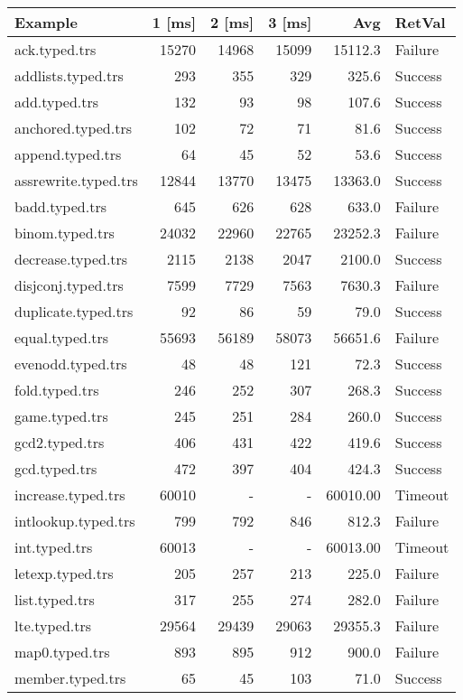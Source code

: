 \documentclass[11pt]{article}
\begin{document}
\begin{center}
\begin{tabular}{lrrrrl}
Example & 1 [ms] & 2 [ms] & 3 [ms] & Avg & RetVal\\
\hline
ack.typed.trs & 15270 & 14968 & 15099 & 15112.3 & Failure\\
addlists.typed.trs & 293 & 355 & 329 & 325.6 & Success\\
add.typed.trs & 132 & 93 & 98 & 107.6 & Success\\
anchored.typed.trs & 102 & 72 & 71 & 81.6 & Success\\
append.typed.trs & 64 & 45 & 52 & 53.6 & Success\\
assrewrite.typed.trs & 12844 & 13770 & 13475 & 13363.0 & Success\\
badd.typed.trs & 645 & 626 & 628 & 633.0 & Failure\\
binom.typed.trs & 24032 & 22960 & 22765 & 23252.3 & Failure\\
decrease.typed.trs & 2115 & 2138 & 2047 & 2100.0 & Success\\
disjconj.typed.trs & 7599 & 7729 & 7563 & 7630.3 & Failure\\
duplicate.typed.trs & 92 & 86 & 59 & 79.0 & Success\\
equal.typed.trs & 55693 & 56189 & 58073 & 56651.6 & Failure\\
evenodd.typed.trs & 48 & 48 & 121 & 72.3 & Success\\
fold.typed.trs & 246 & 252 & 307 & 268.3 & Success\\
game.typed.trs & 245 & 251 & 284 & 260.0 & Success\\
gcd2.typed.trs & 406 & 431 & 422 & 419.6 & Success\\
gcd.typed.trs & 472 & 397 & 404 & 424.3 & Success\\
increase.typed.trs & 60010 & - & - & 60010.00 & Timeout\\
intlookup.typed.trs & 799 & 792 & 846 & 812.3 & Failure\\
int.typed.trs & 60013 & - & - & 60013.00 & Timeout\\
letexp.typed.trs & 205 & 257 & 213 & 225.0 & Failure\\
list.typed.trs & 317 & 255 & 274 & 282.0 & Failure\\
lte.typed.trs & 29564 & 29439 & 29063 & 29355.3 & Failure\\
map0.typed.trs & 893 & 895 & 912 & 900.0 & Failure\\
member.typed.trs & 65 & 45 & 103 & 71.0 & Success\\

\end{tabular}
\end{center}
\end{document}

